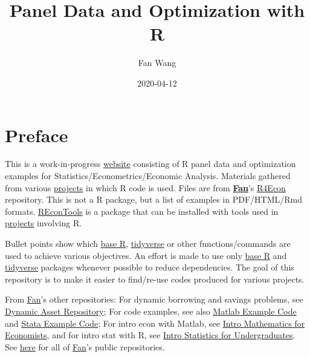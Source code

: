 \documentclass[
]{book}
\title{Panel Data and Optimization with R}
\author{Fan Wang}
\date{2020-04-12}
\begin{document}
\maketitle

{
\setcounter{tocdepth}{1}
\tableofcontents
}
\hypertarget{preface}{%
\chapter*{Preface}\label{preface}}

This is a work-in-progress \href{https://fanwangecon.github.io/R4Econ/}{website} consisting of R panel data and optimization examples for Statistics/Econometrics/Economic Analysis. Materials gathered from various \href{https://fanwangecon.github.io/research}{projects} in which R code is used. Files are from \href{https://fanwangecon.github.io/}{\textbf{Fan}}'s \href{https://github.com/FanWangEcon/R4Econ}{R4Econ} repository. This is not a R package, but a list of examples in PDF/HTML/Rmd formats. \href{https://fanwangcon.github.com/REconTools}{REconTools} is a package that can be installed with tools used in \href{https://fanwangecon.github.io/research}{projects} involving R.

Bullet points show which \href{https://www.rdocumentation.org/packages/base/versions/3.5.2}{base R}, \href{https://www.tidyverse.org/}{tidyverse} or other functions/commands are used to achieve various objectives. An effort is made to use only \href{https://www.rdocumentation.org/packages/base/versions/3.5.2}{base R} and \href{https://www.tidyverse.org/}{tidyverse} packages whenever possible to reduce dependencies. The goal of this repository is to make it easier to find/re-use codes produced for various projects.

From \href{https://fanwangecon.github.io/}{Fan}'s other repositories: For dynamic borrowing and savings problems, see \href{https://fanwangecon.github.io/CodeDynaAsset/}{Dynamic Asset Repository}; For code examples, see also \href{https://fanwangecon.github.io/M4Econ/}{Matlab Example Code} and \href{https://fanwangecon.github.io/Stata4Econ/}{Stata Example Code}; For intro econ with Matlab, see \href{https://fanwangecon.github.io/Math4Econ/}{Intro Mathematics for Economists}, and for intro stat with R, see \href{https://fanwangecon.github.io/Stat4Econ/}{Intro Statistics for Undergraduates}. See \href{https://github.com/FanWangEcon}{here} for all of \href{https://fanwangecon.github.io/}{Fan}'s public repositories.
\end{document}
